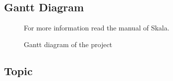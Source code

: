 \bigskip

\subsection{Gantt Diagram}
\label{ssec:gantt}
\begin{figure}[H]
    \centering
    
    \caption[Project's Gantt diagram]{\footnotesize{Gantt diagram of the project}}
    \label{fig:gantt}
    For more information read the manual \cite{skalagantt} of Skala.
\end{figure}

\bigskip

\subsection{Topic}
